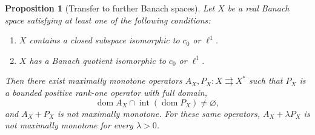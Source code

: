 \documentclass[11pt]{article}
\newcommand{\dom}{\operatorname{dom}}
\newtheorem{proposition}{Proposition}
\theoremstyle{definition}
\theoremstyle{remark}
\begin{document}
\begin{proposition}[Transfer to further Banach spaces]
\label{cor:space-transfer}
Let $X$ be a real Banach space satisfying at least one of the following conditions:
\begin{enumerate}
\item $X$ contains a closed subspace isomorphic to $c_0$ or $\ell^1$.
\item $X$ has a Banach quotient isomorphic to $c_0$ or $\ell^1$.
\end{enumerate}
Then there exist maximally monotone operators $A_X,P_X:X\rightrightarrows X^*$ such that $P_X$ is a bounded positive rank-one operator with full domain,
\[
\dom A_X\cap\operatorname{int}(\dom P_X)\ne\varnothing,
\]
and $A_X+P_X$ is not maximally monotone.
For these same operators, $A_X+\lambda P_X$ is not maximally monotone for every $\lambda>0$.
\end{proposition}
\end{document}
